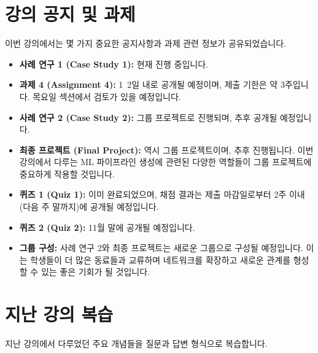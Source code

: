 \documentclass[11pt,a4paper]{article}
\theoremstyle{definition}
\begin{document}
\newpage
\section{강의 공지 및 과제}

이번 강의에서는 몇 가지 중요한 공지사항과 과제 관련 정보가 공유되었습니다.

\begin{itemize}
    \item \textbf{사례 연구 1 (Case Study 1):} 현재 진행 중입니다.
    \item \textbf{과제 4 (Assignment 4):} 1~2일 내로 공개될 예정이며, 제출 기한은 약 3주입니다. 목요일 섹션에서 검토가 있을 예정입니다.
    \item \textbf{사례 연구 2 (Case Study 2):} 그룹 프로젝트로 진행되며, 추후 공개될 예정입니다.
    \item \textbf{최종 프로젝트 (Final Project):} 역시 그룹 프로젝트이며, 추후 진행됩니다. 이번 강의에서 다루는 ML 파이프라인 생성에 관련된 다양한 역할들이 그룹 프로젝트에 중요하게 작용할 것입니다.
    \item \textbf{퀴즈 1 (Quiz 1):} 이미 완료되었으며, 채점 결과는 제출 마감일로부터 2주 이내(다음 주 말까지)에 공개될 예정입니다.
    \item \textbf{퀴즈 2 (Quiz 2):} 11월 말에 공개될 예정입니다.
    \item \textbf{그룹 구성:} 사례 연구 2와 최종 프로젝트는 새로운 그룹으로 구성될 예정입니다. 이는 학생들이 더 많은 동료들과 교류하며 네트워크를 확장하고 새로운 관계를 형성할 수 있는 좋은 기회가 될 것입니다.
\end{itemize}

\newpage
\section{지난 강의 복습}

지난 강의에서 다루었던 주요 개념들을 질문과 답변 형식으로 복습합니다.
\end{document}
